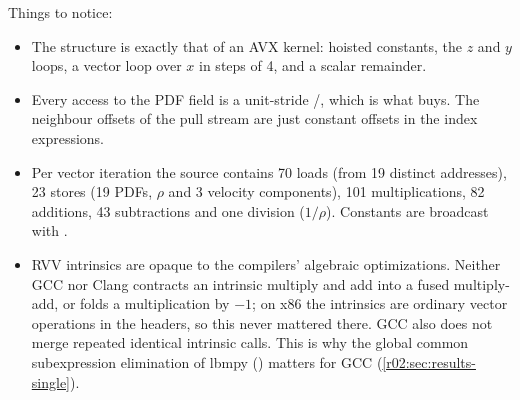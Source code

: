 Things to notice:
\begin{itemize}
  \item The structure is exactly that of an AVX kernel: hoisted constants, the $z$ and
        $y$ loops, a vector loop over $x$ in steps of 4, and a scalar remainder.
  \item Every access to the PDF field is a unit-stride /, which
        is what  buys. The neighbour offsets of the pull
        stream are just constant offsets in the index expressions.
  \item Per vector iteration the source contains 70 loads (from 19 distinct
        addresses), 23 stores (19 PDFs, $\rho$ and 3 velocity components), 101
        multiplications, 82 additions, 43 subtractions and one division ($1/\rho$).
        Constants are broadcast with .
  \item RVV intrinsics are opaque to the compilers' algebraic optimizations. Neither GCC
        nor Clang contracts an intrinsic multiply and add into a fused multiply-add,
        or folds a multiplication by $-1$; on x86 the intrinsics are ordinary vector
        operations in the headers, so this never mattered there. GCC also does not
        merge repeated identical intrinsic calls. This is why the global common
        subexpression elimination of lbmpy () matters for GCC
        (\cref{r02:sec:results-single}).
\end{itemize}

